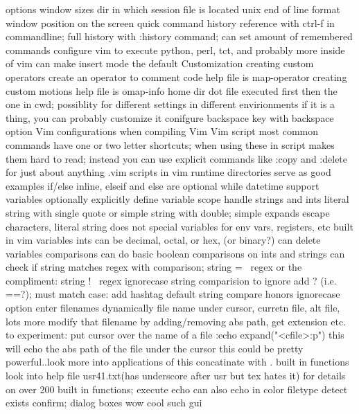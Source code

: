 \documentclass[12pt]{book}
\begin{document}
{{        options
        window sizes
        dir in which session file is located
        unix end of line format
        window position on the screen
  quick command history reference with ctrl-f in commandline; full history with :history command; can set amount of remembered commands
  configure vim to execute python, perl, tct, and probably more inside of vim
  can make insert mode the default
Customization
  creating custom operators
    create an operator to comment code
    help file is map-operator
  creating custom motions
    help file is omap-info
  home dir dot file executed first then the one in cwd; possiblity for different settings in different envirionments
  if it is a thing, you can probably customize it
  conifgure backspace key with backspace option
  Vim configurations when compiling Vim
  Vim script
    most common commands have one or two letter shortcuts; when using these in script makes them hard to read; instead you can use explicit commands like :copy and :delete for just about anything
    .vim scripts in vim runtime directories serve as good examples
    if/else
      inline, elseif and else are optional
    while
    datetime support
    variables
      optionally explicitly define variable scope
      handle strings and ints
      literal string with single quote or simple string with double; simple expands escape characters, literal string does not
      special variables for env vars, registers, etc
      built in vim variables
      ints can be decimal, octal, or hex, (or binary?)
      can delete variables
    comparisons
      can do basic boolean comparisons on ints and strings
      can check if string matches regex with comparison; string =~ regex or the compliment: string !~ regex
      ignorecase string comparision
        to ignore add ? (i.e. ==?); must match case: add hashtag
        default string compare honors ignorecase option
    enter filenames dynamically
      file name under cursor, curretn file, alt file, lots more
      modify that filename by adding/removing abs path, get extension etc.
      to experiment:
        put cursor over the name of a file
        :echo expand("<cfile>:p")
        this will echo the abs path of the file under the cursor
        this could be pretty powerful..look more into applications of this
    concatinate with .
    built in functions
      look into help file usr41.txt(has underscore after usr but tex hates it) for details on over 200 built in functions;
      execute
      echo
        can also echo in color
      filetype detect
      exists
      confirm; dialog boxes wow cool such gui
}}
\end{document}
